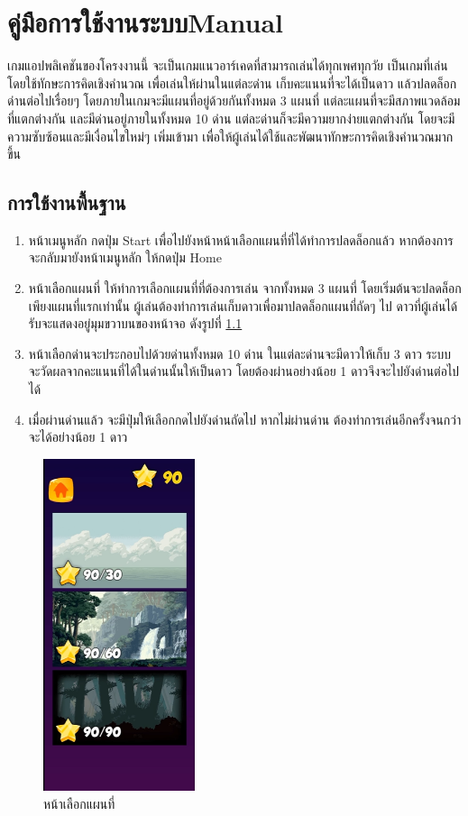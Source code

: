 \chapter{\ifcpe คู่มือการใช้งานระบบ\else Manual\fi}

เกมแอปพลิเคชันของโครงงานนี้ จะเป็นเกมแนวอาร์เคดที่สามารถเล่นได้ทุกเพศทุกวัย 
เป็นเกมที่เล่นโดยใช้ทักษะการคิดเชิงคำนวณ เพื่อเล่นให้ผ่านในแต่ละด่าน เก็บคะแนนที่จะได้เป็นดาว แล้วปลดล็อกด่านต่อไปเรื่อยๆ 
โดยภายในเกมจะมีแผนที่อยู่ด้วยกันทั้งหมด 3 แผนที่ แต่ละแผนที่จะมีสภาพแวดล้อมที่แตกต่างกัน และมีด่านอยู่ภายในทั้งหมด 10 
ด่าน แต่ละด่านก็จะมีความยากง่ายแตกต่างกัน โดยจะมีความซับซ้อนและมีเงื่อนไขใหม่ๆ
เพิ่มเข้ามา เพื่อให้ผู้เล่นได้ใช้และพัฒนาทักษะการคิดเชิงคำนวณมากขึ้น

\section{การใช้งานพื้นฐาน}
\begin{enumerate}
    \item หน้าเมนูหลัก กดปุ่ม Start เพื่อไปยังหน้าหน้าเลือกแผนที่ที่ได้ทำการปลดล็อกแล้ว หากต้องการจะกลับมายังหน้าเมนูหลัก ให้กดปุ่ม Home
    \item หน้าเลือกแผนที่ ให้ทำการเลือกแผนที่ที่ต้องการเล่น จากทั้งหมด 3 แผนที่ โดยเริ่มต้นจะปลดล็อกเพียงแผนที่แรกเท่านั้น ผู้เล่นต้องทำการเล่นเก็บดาวเพื่อมาปลดล็อกแผนที่ถัดๆ ไป ดาวที่ผู้เล่นได้รับจะแสดงอยู่มุมขวาบนของหน้าจอ ดังรูปที่ \ref{mapselection}
    \item หน้าเลือกด่านจะประกอบไปด้วยด่านทั้งหมด 10 ด่าน ในแต่ละด่านจะมีดาวให้เก็บ 3 ดาว ระบบจะวัดผลจากคะแนนที่ได้ในด่านนั้นให้เป็นดาว โดยต้องผ่านอย่างน้อย 1 ดาวจึงจะไปยังด่านต่อไปได้
    \item เมื่อผ่านด่านแล้ว จะมีปุ่มให้เลือกกดไปยังด่านถัดไป หากไม่ผ่านด่าน ต้องทำการเล่นอีกครั้งจนกว่าจะได้อย่างน้อย 1 ดาว
\end{enumerate}

\begin{figure}[h!]
    \begin{center}
    \includegraphics[width=1.75in]{pic/MapSelection.png}
    \end{center}
    \caption[หน้าเลือกแผนที่]{หน้าเลือกแผนที่}
    \label{mapselection}
    \end{figure}

